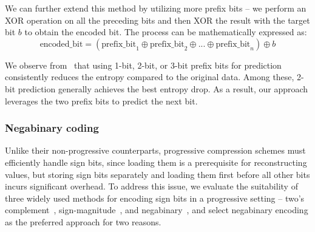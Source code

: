 We can further extend this method by utilizing more prefix bits -- we perform an XOR operation on all the preceding bits and then XOR the result with the target bit $b$ to obtain the encoded bit. The process can be mathematically expressed as:
\[
\text{encoded\_bit} = (\text{prefix\_bit}_1 \oplus \text{prefix\_bit}_2 \oplus ...\oplus \text{prefix\_bit}_n) \oplus b
\]


We observe from~ that using 1-bit, 2-bit, or 3-bit prefix bits for prediction consistently reduces the entropy compared to the original data. Among these, 2-bit prediction generally achieves the best entropy drop. As a result, our approach leverages the two prefix bits to predict the next bit.



\subsubsection{Negabinary coding}
Unlike their non-progressive counterparts, progressive compression schemes must efficiently handle sign bits, since loading them is a prerequisite for reconstructing values, but storing sign bits separately and loading them first before all other bits incurs significant overhead. To address this issue, we evaluate the suitability of three widely used methods for encoding sign bits in a progressive setting -- two's complement~\cite{computer_organization_design}, sign-magnitude~\cite{computer_organization_design}, and negabinary~\cite{hoang2018study, zfp}, and select negabinary encoding as the preferred approach for two reasons.

